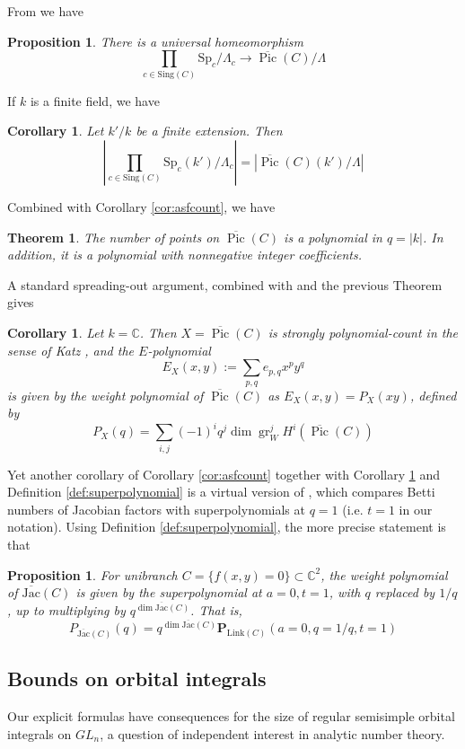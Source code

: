 \documentclass{amsart}
\numberwithin{equation}{section}
\newtheorem{theorem}[lemma]{Theorem}%
\newtheorem{corollary}[lemma]{Corollary}%
\newtheorem{proposition}[lemma]{Proposition}%
\theoremstyle{definition}
\def\Sp{{\mathrm{Sp}}}
\DeclareMathOperator{\Pic}{Pic}
\DeclareMathOperator{\gr}{gr}
\newcommand{\bPic}{\overline{\Pic}}
\newcommand{\C}{{\mathbb C}}
\begin{document}
From \cite[Proposition 2.3.1.]{Laumon} we have 
\begin{proposition}
\label{prop:gkmlaumon}
There is a universal homeomorphism $$\prod_{c\in \text{Sing}(C)} \Sp_c/\Lambda_c \to \bPic(C)/\Lambda$$
\end{proposition}
If $k$ is a finite field, we have
\begin{corollary}
\label{cor:comparecounts}
Let $k'/k$ be a finite extension. Then 
$$\left|\prod_{c\in\text{Sing}(C)}\Sp_c(k')/\Lambda_c\right|=\left|\bPic(C)(k')/\Lambda\right|$$
\end{corollary}
Combined with Corollary \ref{cor:asfcount}, we have 
\begin{theorem}
\label{thm:polynomialcount}\label{cor:nonnegative}
The number of points on $\bPic(C)$ is a polynomial in $q=|k|$. In addition, it is a polynomial with nonnegative integer coefficients.
\end{theorem}
A standard spreading-out argument, combined with \cite[Theorem 1]{Katz} and the previous Theorem gives
\begin{corollary}
Let $k=\C$. Then $X=\bPic(C)$ is strongly polynomial-count in the sense of Katz \cite{Katz}, and the
$E$-polynomial $$E_X(x,y):=\sum_{p,q} e_{p,q} x^py^q$$ is given by the 
weight polynomial of $\bPic(C)$ as $E_X(x,y)=P_X(xy)$, defined by
$$P_X(q)=\sum_{i,j}(-1)^iq^j\dim \gr_{W}^jH^i(\bPic(C))$$
\end{corollary}
Yet another corollary of Corollary \ref{cor:asfcount} together with Corollary \ref{cor:comparecounts} and Definition \ref{def:superpolynomial} is a virtual version of 
\cite[Conjecture 2.4.(iii)]{CD}, which compares Betti numbers of Jacobian factors with superpolynomials at $q=1$ (i.e. $t=1$ in our notation). Using Definition \ref{def:superpolynomial}, the more precise statement is that
\begin{proposition}
\label{prop:superpolycptjac}
For unibranch $C=\{f(x,y)=0\}\subset \C^2$, the weight polynomial of $\overline{\mathrm{Jac}}(C)$ is given by the superpolynomial at $a=0, t=1$, with $q$ replaced by $1/q$, up to multiplying by $q^{\dim \overline{\mathrm{Jac}}(C)}$. That is,
$$P_{\overline{\mathrm{Jac}}(C)}(q)=q^{\dim \overline{\mathrm{Jac}}(C)}\mathbf{P}_{\text{Link}(C)}(a=0,q=1/q,t=1)$$
\end{proposition}

\subsection{Bounds on orbital integrals}\label{sec:boundsOI}
Our explicit formulas have consequences for the size of regular semisimple orbital integrals on $GL_n$, a question of independent interest in analytic number theory.
\end{document}
